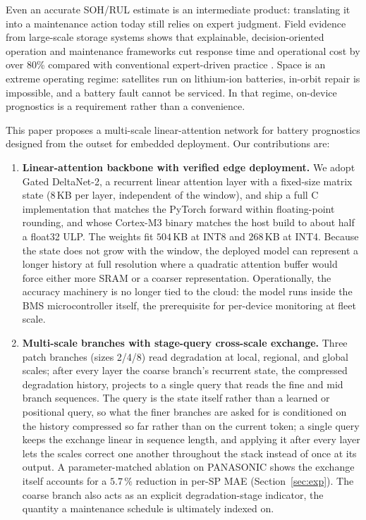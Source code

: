 \documentclass[final,5p,times,twocolumn]{elsarticle}
\begin{document}
Even an
accurate SOH/RUL estimate is an intermediate product: translating
it into a maintenance action today still relies on expert judgment.
Field evidence from large-scale storage systems shows that
explainable, decision-oriented operation and maintenance frameworks
cut response time and operational cost by over 80\% compared with
conventional expert-driven practice \cite{ref_qu_bess}. Space is an extreme operating regime: satellites run on
lithium-ion batteries, in-orbit repair is impossible, and a battery fault
cannot be serviced. In that regime, on-device prognostics is a requirement
rather than a convenience.

This paper proposes a multi-scale linear-attention
network for battery prognostics designed from the outset for embedded
deployment. Our contributions are:

\begin{enumerate}
\item \textbf{Linear-attention backbone with verified edge
deployment.} We adopt Gated DeltaNet-2, a recurrent linear
attention layer with a fixed-size matrix state ($8$\,KB per layer,
independent of the window), and ship a full C
implementation that matches the PyTorch forward within
floating-point rounding, and whose Cortex-M3 binary matches the host
build to about half a float32 ULP. The weights fit $504$\,KB at INT8
and $268$\,KB at INT4. Because the state
does not grow with the window, the deployed model can represent a
longer history at full resolution where a quadratic attention buffer
would force either more SRAM or a coarser representation.
Operationally, the accuracy machinery is no longer tied to the
cloud: the model runs inside the BMS microcontroller itself, the
prerequisite for per-device monitoring at fleet scale.

\item \textbf{Multi-scale branches with stage-query cross-scale
exchange.} Three patch branches (sizes 2/4/8) read degradation at
local, regional, and global scales; after every layer the coarse
branch's recurrent state, the compressed degradation history, projects to
a single query that reads the fine and mid branch sequences. The query is
the state itself rather than a learned or positional query, so what the
finer branches are asked for is conditioned on the history compressed so
far rather than on the current token; a single query keeps the exchange
linear in sequence length, and applying it after every layer lets the
scales correct one another throughout the stack instead of once at its
output.
A parameter-matched ablation on PANASONIC shows the exchange itself
accounts for a $5.7\,\%$ reduction in per-SP MAE
(Section~\ref{sec:exp}). The coarse
branch also
acts as an explicit degradation-stage indicator, the quantity a
maintenance schedule is ultimately indexed on.


\end{enumerate}
\end{document}
